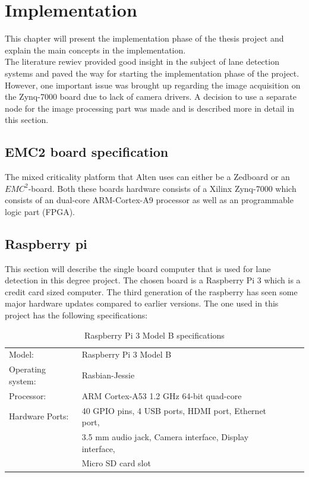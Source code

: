 \chapter{Implementation}
This chapter will present the implementation phase of the thesis project and explain the main concepts in the implementation.\\

The literature rewiev provided good insight in the subject of lane detection systems and paved the way for starting the implementation phase of the project. However, one important issue was brought up  regarding the image acquisition on the Zynq-7000 board due to lack of camera drivers. A decision to use a separate node for the image processing part was made and is described more in detail in this section.
\section{EMC2 board specification}
The mixed criticality platform that Alten uses can either be a Zedboard or an $EMC^2$-board. Both these boards hardware consists of a Xilinx Zynq-7000 which consists of an dual-core ARM-Cortex-A9 processor as well as an programmable logic part (FPGA). 
\section{Raspberry pi}
This section will describe the single board computer that is used for lane detection in this degree project. The chosen board is a Raspberry Pi 3 which is a credit card sized computer. The third generation of the raspberry has seen some major hardware updates compared to earlier versions. The one used in this project has the following specifications:


\begin{table}[H]
\centering
\caption{Raspberry Pi 3 Model B specifications}
\label{my-label}
\begin{tabular}{lllll}
 Model:	&Raspberry Pi 3 Model B  \\
 Operating system:	&Rasbian-Jessie  \\
 Processor:	&ARM Cortex-A53 1.2 GHz 64-bit quad-core  \\
 Hardware Ports:	&40 GPIO pins, 4 USB ports, HDMI port, Ethernet port,\\  &3.5 mm audio jack, Camera interface, Display interface,\\  &Micro SD card slot
\end{tabular}
\end{table}


